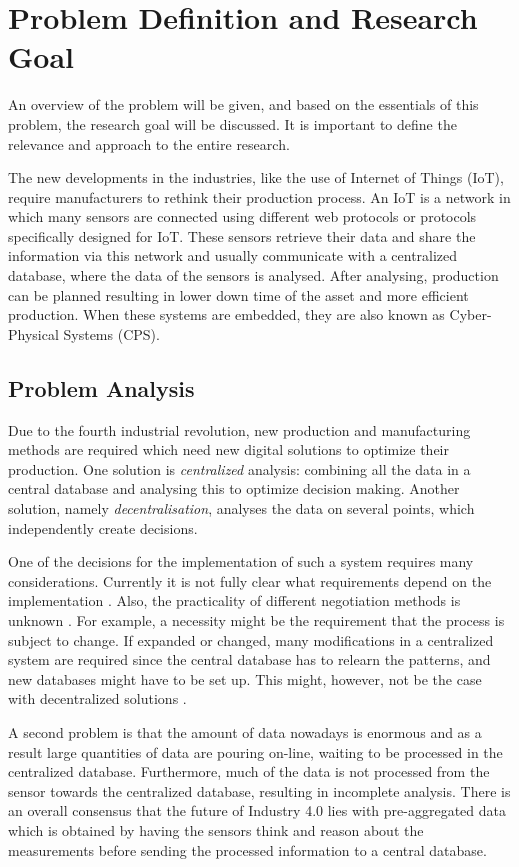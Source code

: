 \chapter{Problem Definition and Research Goal}
\label{chp:problem}
An overview of the problem will be given, and based on the essentials of this problem, the research goal will be discussed. It is important to define the relevance and approach to the entire research.

The new developments in the industries, like the use of Internet of Things (IoT), require manufacturers to rethink their production process. An IoT is a network in which many sensors are connected using different web protocols or protocols specifically designed for IoT. These sensors retrieve their data and share the information via this network and usually communicate with a centralized database, where the data of the sensors is analysed. After analysing, production can be planned resulting in lower down time of the asset and more efficient production. When these systems are embedded, they are also known as Cyber-Physical Systems (CPS). 
\section{Problem Analysis}
Due to the fourth industrial revolution, new production and manufacturing methods are required which need new digital solutions to optimize their production. One solution is \textit{centralized} analysis: combining all the data in a central database and analysing this to optimize decision making. Another solution, namely \textit{decentralisation}, analyses the data on several points, which independently create decisions.

One of the decisions for the implementation of such a system requires many considerations. Currently it is not fully clear what requirements depend on the implementation \citep{leitao2016smart}. Also, the practicality of different negotiation methods is unknown \citep{fatima2014principles}. For example, a necessity might be the requirement that the process is subject to change. If expanded or changed, many modifications in a centralized system are required since the central database has to relearn the patterns, and new databases might have to be set up. This might, however, not be the case with decentralized solutions \citep{leitao2015industrial}. %

A second problem is that the amount of data nowadays is enormous and as a result large quantities of data are pouring on-line, waiting to be processed in the centralized database. Furthermore, much of the data is not processed from the sensor towards the centralized database, resulting in incomplete analysis. There is an overall consensus that the future of Industry 4.0 lies with pre-aggregated data \citep{deloitte2015connected} which is obtained by having the sensors think and reason about the measurements before sending the processed information to a central database.

